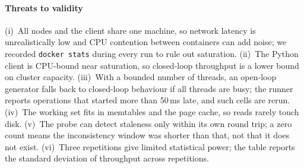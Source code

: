 \paragraph{Threats to validity}
(i)~All nodes and the client share one machine, so network latency is unrealistically low
and CPU contention between containers can add noise; we recorded \texttt{docker stats}
during every run to rule out saturation. (ii)~The Python client is CPU-bound near
saturation, so closed-loop throughput is a lower bound on cluster capacity. (iii)~With a
bounded number of threads, an open-loop generator falls back to closed-loop behaviour if
all threads are busy; the runner reports operations that started more than 50\,ms late, and
such cells are rerun. (iv)~The working set fits in memtables and the page cache, so reads
rarely touch disk. (v)~The probe can detect staleness only within its own round trip;
a zero count means the inconsistency window was shorter than that, not that it does not
exist. (vi)~Three repetitions give limited statistical power; the table reports the
standard deviation of throughput across repetitions.
